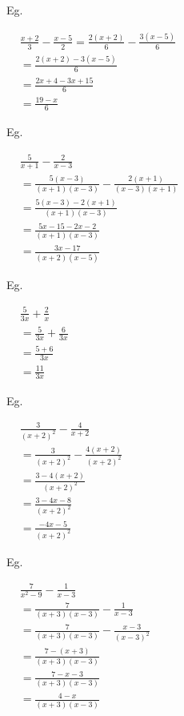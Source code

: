 \documentclass[twocolumn]{article}
\begin{document}
\noindent 
Eg.

\noindent 
$
\begin{aligned}
	& \frac{x+2}{3}-\frac{x-5}{2}=\frac{2(x+2)}{6}-\frac{3(x-5)}{6} \\	
	& =\frac{2(x+2)-3(x-5)}{6} \\
	& =\frac{2 x+4-3 x+15}{6} \\
	& =\frac{19-x}{6}
\end{aligned}
$

\bigskip 

\noindent 
Eg.

\noindent 
$
\begin{aligned}
	& \frac{5}{x+1}-\frac{2}{x-3} \\
	& =\frac{5(x-3)}{(x+1)(x-3)}-\frac{2(x+1)}{(x-3)(x+1)} \\
	& =\frac{5(x-3)-2(x+1)}{(x+1)(x-3)} \\
	& =\frac{5 x-15-2 x-2}{(x+1)(x-3)} \\
	& =\frac{3 x-17}{(x+2)(x-5)}
\end{aligned}
$

\bigskip 

\noindent 
Eg.

\noindent 
$
\begin{aligned}
	& \frac{5}{3 x}+\frac{2}{x} \\
	& = \frac{5}{3 x}+\frac{6}{3x} \\
	& =\frac{5+6}{3 x} \\
	& =\frac{11}{3 x}
\end{aligned}
$

\bigskip 

\noindent 
Eg. 

\noindent 
$
\begin{aligned}
	& \frac{3}{(x+2)^2}-\frac{4}{x+2} \\
	& =\frac{3}{(x+2)^2}-\frac{4(x+2)}{(x+2)^2} \\	
	& =\frac{3-4(x+2)}{(x+2)^2} \\
	& =\frac{3-4 x-8}{(x+2)^2} \\
	& =\frac{-4 x-5}{(x+2)^2}
\end{aligned}
$

\bigskip 

\noindent 
Eg. 

\noindent 
$
\begin{aligned}
	& \frac{7}{x^2-9}-\frac{1}{x-3} \\
	& =\frac{7}{(x+3)(x-3)}-\frac{1}{x-3} \\
	& =\frac{7}{(x+3)(x-3)}-\frac{x-3}{(x-3)^2} \\	
	& =\frac{7-(x+3)}{(x+3)(x-3)} \\
	& =\frac{7-x-3}{(x+3)(x-3)} \\
	& =\frac{4-x}{(x+3)(x-3)}
\end{aligned}
$
\end{document}
